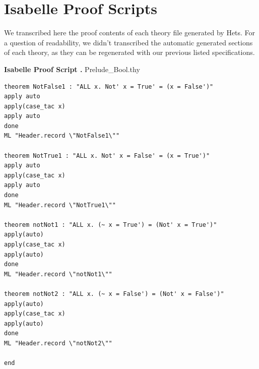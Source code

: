 \documentclass[12pt,twoside]{article}
\numberwithin{spec}{subsection}
\numberwithin{proof}{subsection}
\numberwithin{figure}{subsection}
\numberwithin{code}{subsection}
\begin{document}
\section{Isabelle Proof Scripts}
\label{appendix:proofs}
We transcribed here the proof contents of each theory file generated by Hets. For a question of readability, we didn't transcribed the automatic generated sections of each theory, as they can be regenerated with our previous listed specifications.


\begin{multicols}{2}
\addtocounter{appindex}{1}
\large{\textbf{Isabelle Proof Script \thesection{}.\theappindex{}} Prelude\_Bool.thy}

\label{pscript:Bool}
\tiny
\begin{verbatim}
theorem NotFalse1 : "ALL x. Not' x = True' = (x = False')"
apply auto
apply(case_tac x)
apply auto
done
ML "Header.record \"NotFalse1\""

theorem NotTrue1 : "ALL x. Not' x = False' = (x = True')"
apply auto
apply(case_tac x)
apply auto
done
ML "Header.record \"NotTrue1\""

theorem notNot1 : "ALL x. (~ x = True') = (Not' x = True')"
apply(auto)
apply(case_tac x)
apply(auto)
done
ML "Header.record \"notNot1\""

theorem notNot2 : "ALL x. (~ x = False') = (Not' x = False')"
apply(auto)
apply(case_tac x)
apply(auto)
done
ML "Header.record \"notNot2\""

end
\end{verbatim}
\end{multicols}
\end{document}
